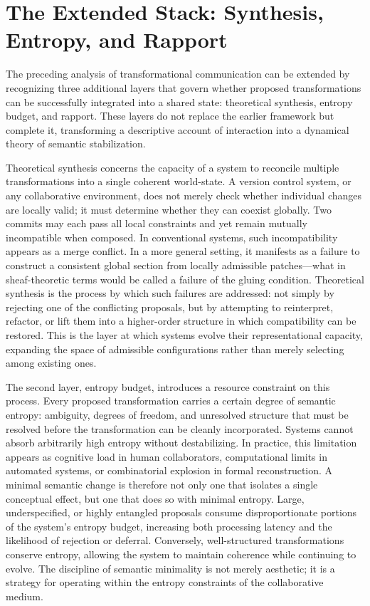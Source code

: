 \documentclass[12pt, letterpaper]{article}
\begin{document}
\section{The Extended Stack: Synthesis, Entropy, and Rapport}

The preceding analysis of transformational communication can be extended by recognizing three additional layers that govern whether proposed transformations can be successfully integrated into a shared state: theoretical synthesis, entropy budget, and rapport. These layers do not replace the earlier framework but complete it, transforming a descriptive account of interaction into a dynamical theory of semantic stabilization.

Theoretical synthesis concerns the capacity of a system to reconcile multiple transformations into a single coherent world-state. A version control system, or any collaborative environment, does not merely check whether individual changes are locally valid; it must determine whether they can coexist globally. Two commits may each pass all local constraints and yet remain mutually incompatible when composed. In conventional systems, such incompatibility appears as a merge conflict. In a more general setting, it manifests as a failure to construct a consistent global section from locally admissible patches---what in sheaf-theoretic terms would be called a failure of the gluing condition. Theoretical synthesis is the process by which such failures are addressed: not simply by rejecting one of the conflicting proposals, but by attempting to reinterpret, refactor, or lift them into a higher-order structure in which compatibility can be restored. This is the layer at which systems evolve their representational capacity, expanding the space of admissible configurations rather than merely selecting among existing ones.

The second layer, entropy budget, introduces a resource constraint on this process. Every proposed transformation carries a certain degree of semantic entropy: ambiguity, degrees of freedom, and unresolved structure that must be resolved before the transformation can be cleanly incorporated. Systems cannot absorb arbitrarily high entropy without destabilizing. In practice, this limitation appears as cognitive load in human collaborators, computational limits in automated systems, or combinatorial explosion in formal reconstruction. A minimal semantic change is therefore not only one that isolates a single conceptual effect, but one that does so with minimal entropy. Large, underspecified, or highly entangled proposals consume disproportionate portions of the system's entropy budget, increasing both processing latency and the likelihood of rejection or deferral. Conversely, well-structured transformations conserve entropy, allowing the system to maintain coherence while continuing to evolve. The discipline of semantic minimality is not merely aesthetic; it is a strategy for operating within the entropy constraints of the collaborative medium.
\end{document}
